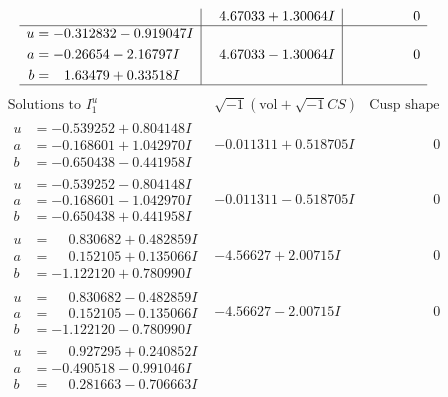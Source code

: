 \documentclass[1p]{elsarticle_modified}
\theoremstyle{definition}
\newcommand{\I}{\sqrt{-1}}
\begin{document}
$$\begin{array}{c|c|c}
 & \phantom{-}4.67033 + 1.30064 I & \phantom{-0.000000 } 0 \\ \hline\begin{aligned}
u &= -0.312832 - 0.919047 I \\
a &= -0.26654 - 2.16797 I \\
b &= \phantom{-}1.63479 + 0.33518 I\end{aligned}
 & \phantom{-}4.67033 - 1.30064 I & \phantom{-0.000000 } 0\\
 \hline 
 \end{array}$$\newpage$$\begin{array}{c|c|c}  
\text{Solutions to }I^u_{1}& \I (\text{vol} + \sqrt{-1}CS) & \text{Cusp shape}\\
 \hline 
\begin{aligned}
u &= -0.539252 + 0.804148 I \\
a &= -0.168601 + 1.042970 I \\
b &= -0.650438 - 0.441958 I\end{aligned}
 & -0.011311 + 0.518705 I & \phantom{-0.000000 } 0 \\ \hline\begin{aligned}
u &= -0.539252 - 0.804148 I \\
a &= -0.168601 - 1.042970 I \\
b &= -0.650438 + 0.441958 I\end{aligned}
 & -0.011311 - 0.518705 I & \phantom{-0.000000 } 0 \\ \hline\begin{aligned}
u &= \phantom{-}0.830682 + 0.482859 I \\
a &= \phantom{-}0.152105 + 0.135066 I \\
b &= -1.122120 + 0.780990 I\end{aligned}
 & -4.56627 + 2.00715 I & \phantom{-0.000000 } 0 \\ \hline\begin{aligned}
u &= \phantom{-}0.830682 - 0.482859 I \\
a &= \phantom{-}0.152105 - 0.135066 I \\
b &= -1.122120 - 0.780990 I\end{aligned}
 & -4.56627 - 2.00715 I & \phantom{-0.000000 } 0 \\ \hline\begin{aligned}
u &= \phantom{-}0.927295 + 0.240852 I \\
a &= -0.490518 - 0.991046 I \\
b &= \phantom{-}0.281663 - 0.706663 I\end{aligned}

\end{array}$$
\end{document}
